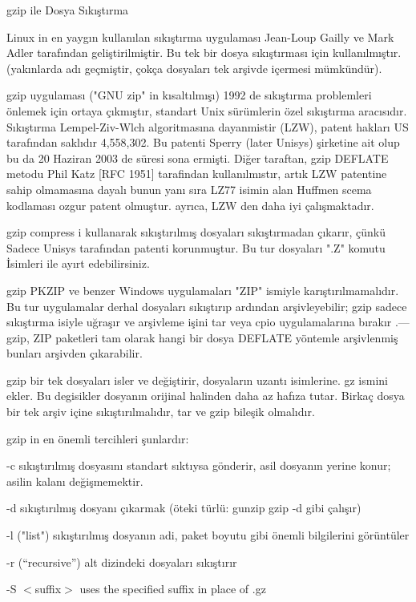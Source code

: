 \documentclass[10pt,a5paper]{book}
\begin{document}
\begin{section}{gzip ile Dosya Sıkıştırma}

Linux in en yaygın kullanılan sıkıştırma uygulaması Jean-Loup Gailly ve Mark Adler tarafından geliştirilmiştir. Bu tek bir dosya sıkıştırması için kullanılmıştır. (yakınlarda adı geçmiştir, çokça dosyaları tek arşivde içermesi mümkündür).

gzip uygulaması ("GNU zip" in kısaltılmışı) 1992 de sıkıştırma problemleri önlemek için ortaya çıkmıştır, standart Unix sürümlerin özel sıkıştırma aracısıdır. Sıkıştırma Lempel-Ziv-Wlch algoritmasına dayanmistir (LZW), patent hakları US tarafından saklıdır 4,558,302. Bu patenti Sperry (later Unisys) şirketine ait olup bu da 20 Haziran 2003 de süresi sona ermişti. Diğer taraftan, gzip DEFLATE metodu Phil Katz [RFC 1951] tarafindan  kullanılmıstır, artık LZW patentine sahip olmamasına dayalı bunun yanı sıra LZ77 isimin alan Huffmen scema kodlaması ozgur patent olmuştur. ayrıca, LZW den daha iyi çalışmaktadır.

gzip compress i kullanarak sıkıştırılmış dosyaları sıkıştırmadan çıkarır, çünkü
Sadece Unisys tarafından patenti korunmuştur. Bu tur dosyaları ".Z" komutu
İsimleri ile ayırt edebilirsiniz. 

gzip PKZIP ve benzer Windows uygulamaları "ZIP" ismiyle karıştırılmamalıdır. Bu tur uygulamalar derhal dosyaları sıkıştırıp ardından arşivleyebilir; gzip sadece sıkıştırma isiyle uğraşır ve arşivleme işini tar veya cpio uygulamalarına bırakır .—gzip, ZIP paketleri tam olarak hangi bir dosya DEFLATE yöntemle arşivlenmiş bunları arşivden çıkarabilir.

gzip bir tek dosyaları isler ve değiştirir, dosyaların uzantı isimlerine. gz ismini ekler. Bu degisikler dosyanın orijinal halinden daha az hafıza tutar. Birkaç dosya bir tek arşiv içine sıkıştırılmalıdır, tar ve gzip bileşik olmalıdır.

gzip in en önemli tercihleri şunlardır:

-c sıkıştırılmış dosyasını standart sıktıysa gönderir, asil dosyanın yerine konur;
asilin kalanı değişmemektir.

-d sıkıştırılmış dosyanı çıkarmak (öteki türlü: gunzip gzip -d gibi çalışır)

-l ("list") sıkıştırılmış dosyanın adi, paket boyutu gibi önemli bilgilerini görüntüler

-r (“recursive”) alt dizindeki dosyaları sıkıştırır

-S $<$suffix$>$ uses the specified suffix in place of .gz


\end{section}
\end{document}
